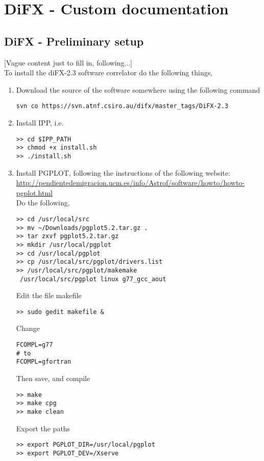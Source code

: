 
\chapter{DiFX - Custom documentation}
\label{AppendixB}

\section{DiFX - Preliminary setup}
[Vague content just to fill in, following$\ldots$]\\
To install the diFX-2.3 software correlator do the following things,
\begin{enumerate}
\item Download the source of the software somewhere using the following command
\begin{verbatim}
svn co https://svn.atnf.csiro.au/difx/master_tags/DiFX-2.3
\end{verbatim}

\item Install IPP, i.e.
\begin{verbatim}
>> cd $IPP_PATH
>> chmod +x install.sh
>> ./install.sh
\end{verbatim}

\item Install PGPLOT, following the instructions of the following website:\\
\url{http://pendientedemigracion.ucm.es/info/Astrof/software/howto/howto-pgplot.html}\\
Do the following,
\begin{verbatim}
>> cd /usr/local/src
>> mv ~/Downloads/pgplot5.2.tar.gz .
>> tar zxvf pgplot5.2.tar.gz
>> mkdir /usr/local/pgplot
>> cd /usr/local/pgplot
>> cp /usr/local/src/pgplot/drivers.list 
>> /usr/local/src/pgplot/makemake
 /usr/local/src/pgplot linux g77_gcc_aout
\end{verbatim}

Edit the file makefile
\begin{verbatim}
>> sudo gedit makefile &
\end{verbatim}
Change
\begin{verbatim}
FCOMPL=g77
# to 
FCOMPL=gfortran
\end{verbatim}
Then save, and compile
\begin{verbatim}
>> make
>> make cpg
>> make clean
\end{verbatim}
Export the paths
\begin{verbatim}
>> export PGPLOT_DIR=/usr/local/pgplot
>> export PGPLOT_DEV=/Xserve
\end{verbatim}


\end{enumerate}
